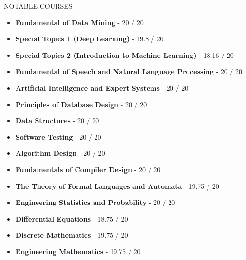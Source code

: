 \documentclass[]{CV}
\begin{document}
\begin{section}{NOTABLE COURSES}
\begin{multicols}{2}
    \begin{itemize}
	\item \textbf{Fundamental of Data Mining} - 20 / 20
	\item \textbf{Special Topics 1 (Deep Learning)} - 19.8 / 20
	\item \textbf{Special Topics 2 (Introduction to Machine Learning)} - 18.16 / 20
	\item \textbf{Fundamental of Speech and Natural Language Processing} - 20 / 20
	\item \textbf{Artificial Intelligence and Expert Systems} - 20 / 20
	
	\item \textbf{Principles of Database Design} - 20 / 20
	\item \textbf{Data Structures} - 20 / 20
	\item \textbf{Software Testing} - 20 / 20
	\item \textbf{Algorithm Design} - 20 / 20
	\item \textbf{Fundamentals of Compiler Design} - 20 / 20
	\item \textbf{The Theory of Formal Languages ​​and Automata} - 19.75 / 20
	
	\item \textbf{Engineering Statistics and Probability} - 20 / 20
	\item \textbf{Differential Equations} - 18.75 / 20
	\item \textbf{Discrete Mathematics} - 19.75 / 20
	\item \textbf{Engineering Mathematics} - 19.75 / 20
    \end{itemize}
    \end{multicols}
\end{section}
\end{document}
